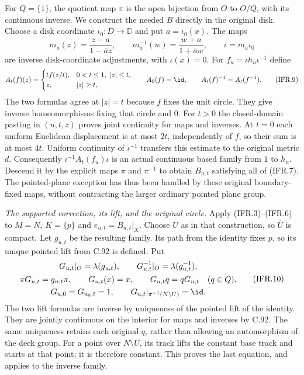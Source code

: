 For $Q=\{1\}$, the quotient map $\pi$ is the open bijection
from $O$ to $O/Q$, with its continuous inverse. We construct the
needed $B$ directly in the original disk. Choose a disk coordinate
$\iota_0:\overline D\to\overline{\mathbb D}$ and put $a=\iota_0(x)$.
The maps
\[
 m_a(z)=\frac{z-a}{1-\overline a z},\qquad
 m_a^{-1}(w)=\frac{w+a}{1+\overline a w},\qquad
 \iota=m_a\iota_0
                                                               \tag{IFR.8}
\]
are inverse disk-coordinate adjustments, with $\iota(x)=0$.
For $f_u=\iota h_u\iota^{-1}$ define
\[
 A_t(f)(z)=
 \begin{cases}
  t f(z/t),&0<t\leq1,\ |z|\leq t,\\
  z,&|z|\geq t,
 \end{cases}
 \qquad A_0(f)=\id,\qquad A_t(f)^{-1}=A_t(f^{-1}).                \tag{IFR.9}
\]
The two formulas agree at $|z|=t$ because $f$ fixes the unit circle.
They give inverse homeomorphisms fixing that circle and $0$.
For $t>0$ the closed-domain pasting in $(u,t,z)$ proves joint
continuity for maps and inverses. At $t=0$ each uniform Euclidean
displacement is at most $2t$, independently of $f$, so their sum
is at most $4t$. Uniform continuity of $\iota^{-1}$ transfers
this estimate to the original metric $d$. Consequently
$\iota^{-1}A_t(f_u)\iota$ is an actual continuous based family
from $1$ to $h_u$. Descend it by the explicit maps $\pi$ and
$\pi^{-1}$ to obtain $B_{u,t}$ satisfying all of (IFR.7).
The pointed-plane exception has thus been handled by these original
boundary-fixed maps, without contracting the larger ordinary pointed
plane group.

\emph{The supported correction, its lift, and the original circle.}
Apply (IFR.3)--(IFR.6) to $M=N$, $K=\{p\}$ and
$e_{u,t}=B_{u,t}|_X$. Choose $U$ as in that construction, so
$\overline U$ is compact. Let $g_{u,t}$ be the resulting family.
Its path from the identity fixes $p$, so its unique pointed lift
from C.92 is defined. Put
\[
\begin{gathered}
 G_{u,t}|_O=\lambda(g_{u,t}),\qquad
 G_{u,t}^{-1}|_O=\lambda(g_{u,t}^{-1}),\\
 \pi G_{u,t}=g_{u,t}\pi,\qquad
 G_{u,t}(x)=x,\qquad G_{u,t}q=qG_{u,t}\quad(q\in Q),\\
 G_{u,0}=G_{u_0,t}=1,\qquad
 G_{u,t}|_{\pi^{-1}(N\setminus U)}=\id.
\end{gathered}                                                    \tag{IFR.10}
\]
The two lift formulas are inverse by uniqueness of the pointed lift
of the identity. They are jointly continuous on the interior for
maps and inverses by C.92. The same uniqueness retains each original
$q$, rather than allowing an automorphism of the deck group.
For a point over $N\setminus U$, its track lifts the constant
base track and starts at that point; it is therefore constant.
This proves the last equation, and applies to the inverse family.

